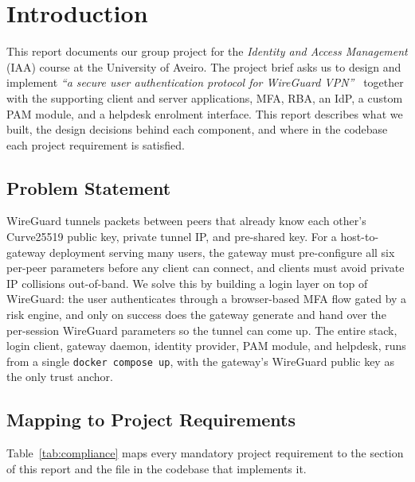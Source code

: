 \section{Introduction}
\label{sec:intro}

This report documents our group project for the
\emph{Identity and Access Management} (IAA) course at the University of
Aveiro.
The project brief asks us to design
and implement \emph{``a secure user authentication protocol for WireGuard
VPN''}~\cite{donenfeld2017wireguard} together with the supporting client
and server applications, MFA, RBA, an IdP, a custom PAM module, and a
helpdesk enrolment interface.
This report describes what we built, the design decisions behind each
component, and where in the codebase each project requirement is
satisfied.

\subsection{Problem Statement}
WireGuard tunnels packets between peers that already know each other's
Curve25519 public key, private tunnel IP, and pre-shared key.
For a host-to-gateway deployment serving many users, the gateway must
pre-configure all six per-peer parameters before any client can connect,
and clients must avoid private IP collisions out-of-band.
We solve this by building a login layer on top of WireGuard: the user
authenticates through a browser-based MFA flow gated by a risk engine,
and only on success does the gateway generate and hand over the
per-session WireGuard parameters so the tunnel can come up.
The entire stack, login client, gateway daemon, identity provider, PAM
module, and helpdesk, runs from a single \texttt{docker compose up},
with the gateway's WireGuard public key as the only trust anchor.

\subsection{Mapping to Project Requirements}
Table~\ref{tab:compliance} maps every mandatory project requirement to
the section of this report and the file in the codebase that implements
it.

